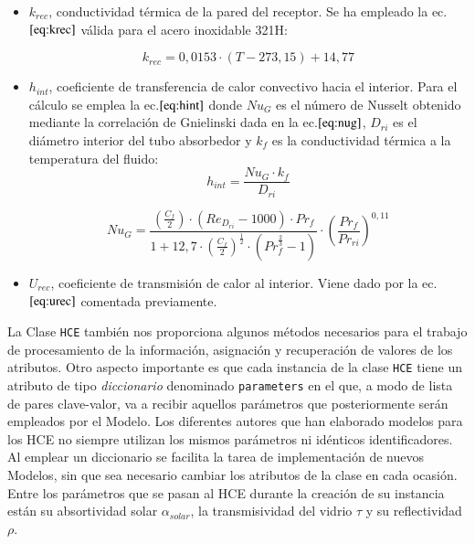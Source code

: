 \begin{itemize}
\item
  \(k_{rec}\), conductividad térmica de la pared del receptor. Se ha  empleado la ec.\(\eqref{eq:krec}\) válida para el acero inoxidable
  321H:

\begin{equation}
    k_{rec} = 0,0153 \cdot (T - 273,15) + 14,77
    \label{eq:krec}
\end{equation}
\end{itemize}

\begin{itemize}
\item
  \(h_{int}\), coeficiente de transferencia de calor convectivo hacia el   interior. Para el cálculo se emplea la ec.\(\eqref{eq:hint}\) donde   \(Nu_{G}\) es el número de Nusselt obtenido mediante la correlación de   Gnielinski dada en la ec.\(\eqref{eq:nug}\), \(D_{ri}\) es el diámetro   interior del tubo absorbedor y \(k_f\) es la conductividad térmica a   la temperatura del fluido: 
\begin{equation}
    h_{int} = \frac{Nu_{G}\cdot k_f }{D_{ri}}
    \label{eq:hint}
\end{equation}

\begin{equation}
    Nu_{G} = \frac{ \left( \frac{C_f}{2} \right)\cdot\left( Re_{D_{ri}} - 1000 \right)\cdot Pr_f }{1 + 12,7 \cdot \left(\frac{C_f}{2} \right)^{\frac{1}{2}}\cdot \left(Pr^{\frac{2}{3}}_f -1 \right)} \cdot \left( \frac{Pr_f}{Pr_{ri}} \right)^{0,11}
    \label{eq:nug}
\end{equation}

\item
  \(U_{rec}\), coeficiente de transmisión de calor al interior. Viene   dado por la ec.\(\eqref{eq:urec}\) comentada previamente. 
\end{itemize}

La Clase \texttt{HCE} también nos proporciona algunos métodos necesarios para el trabajo de procesamiento de la información, asignación y recuperación de valores de los atributos. Otro aspecto importante es que cada instancia de la clase \texttt{HCE} tiene un
atributo de tipo \emph{diccionario} denominado \texttt{parameters}  en el que, a modo de lista de pares clave-valor, va a recibir aquellos parámetros que posteriormente serán empleados por el Modelo. Los diferentes autores que han elaborado modelos para los HCE no siempre utilizan los mismos parámetros ni idénticos identificadores. Al emplear un diccionario se facilita la tarea de implementación de nuevos Modelos, sin que sea necesario cambiar los atributos de la clase en cada ocasión. Entre los parámetros que se
pasan al HCE durante la creación de su instancia están su absortividad solar \(\alpha_{solar}\), la transmisividad del vidrio \(\tau\) y su reflectividad \(\rho\).

